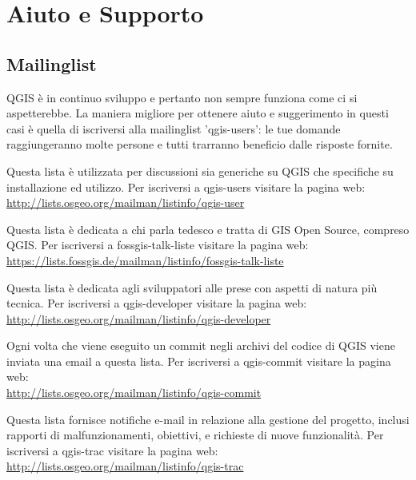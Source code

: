 
\chapter{Aiuto e Supporto}\label{label_helpsupport}


\section{Mailinglist}
QGIS è in continuo sviluppo e pertanto non sempre funziona come ci si aspetterebbe.
La maniera migliore per ottenere aiuto e suggerimento in questi casi è quella 
di iscriversi alla mailinglist 'qgis-users': le tue domande raggiungeranno 
molte persone e tutti trarranno beneficio dalle risposte fornite.

Questa lista è utilizzata per discussioni sia generiche su QGIS che 
specifiche su installazione ed utilizzo. 
Per iscriversi a qgis-users visitare la pagina web: \\
\url{http://lists.osgeo.org/mailman/listinfo/qgis-user}

Questa lista è dedicata a chi parla tedesco e tratta di GIS Open Source, 
compreso QGIS.
Per iscriversi a fossgis-talk-liste visitare la pagina web: \\
\url{https://lists.fossgis.de/mailman/listinfo/fossgis-talk-liste}

Questa lista è dedicata agli sviluppatori alle prese con aspetti di natura più tecnica.
Per iscriversi a qgis-developer visitare la pagina web: \\
\url{http://lists.osgeo.org/mailman/listinfo/qgis-developer}

Ogni volta che viene eseguito un commit negli archivi del codice di QGIS viene 
inviata una email a questa lista.
Per iscriversi a qgis-commit visitare la pagina web: \\
\url{http://lists.osgeo.org/mailman/listinfo/qgis-commit}

Questa lista fornisce notifiche e-mail in relazione alla gestione del progetto, inclusi 
rapporti di malfunzionamenti, obiettivi, e richieste di nuove funzionalità.
Per iscriversi a qgis-trac visitare la pagina web: \\
\url{http://lists.osgeo.org/mailman/listinfo/qgis-trac}

